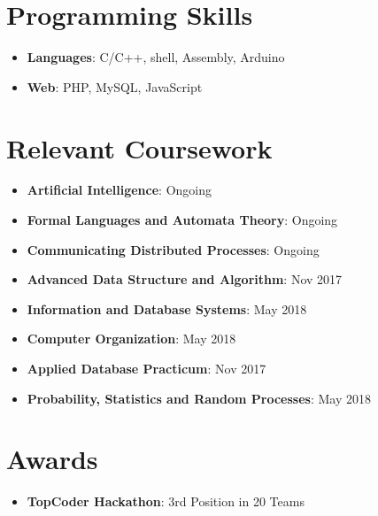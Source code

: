 \documentclass[letterpaper,11pt]{article}
\newcommand{\resumeItem}[2]{
  \item\small{
    \textbf{#1}{: #2 \vspace{-2pt}}
  }
}
\newcommand{\resumeSubItem}[2]{\resumeItem{#1}{#2}\vspace{-4pt}}
\newcommand{\resumeSubHeadingListStart}{\begin{itemize}[leftmargin=*]}
\newcommand{\resumeSubHeadingListEnd}{\end{itemize}}
\begin{document}
\section{Programming Skills}
\resumeSubHeadingListStart
    \resumeSubItem{Languages}
      {C/C++, shell, Assembly, Arduino}
    \resumeSubItem{Web}
      {PHP, MySQL, JavaScript}
  \resumeSubHeadingListEnd
  
\section{Relevant Coursework}
  \resumeSubHeadingListStart

    \resumeSubItem
      {Artificial Intelligence}{Ongoing}
     \resumeSubItem
      {Formal Languages and Automata Theory}{Ongoing}
    \resumeSubItem
      {Communicating Distributed Processes}{Ongoing}
      \resumeSubItem
      {Advanced Data Structure and Algorithm}{Nov 2017}
      \resumeSubItem
      {Information and Database Systems}{May 2018}
      \resumeSubItem
      {Computer Organization}{May 2018}
      \resumeSubItem
      {Applied Database Practicum}{Nov 2017}
      \resumeSubItem
      {Probability, Statistics and Random Processes}{May 2018}
    

  \resumeSubHeadingListEnd

\section{Awards}
  \resumeSubHeadingListStart

    \resumeSubItem
    {TopCoder Hackathon}{3rd Position in 20 Teams}

 \resumeSubHeadingListEnd

\end{document}

